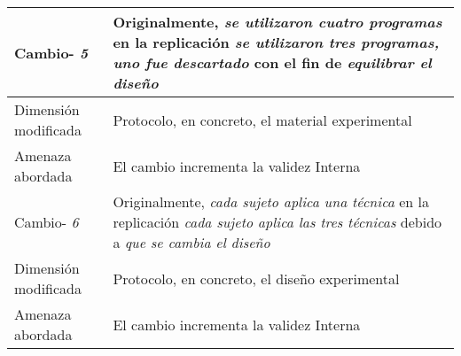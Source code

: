 

\begin{table}

\begin{tabular}{| p{3.3cm} | p{9cm} |}
 \hline
Cambio- \textit{5}   & \parbox[t]{9cm} {Originalmente,  \textit{se utilizaron cuatro programas} } \parbox[t]{9cm}{en la replicación \textit{se utilizaron tres programas, uno fue descartado } }  con el fin de  \textit{equilibrar el diseño} \\  \hline
Dimensión modificada & Protocolo, en concreto, el material experimental
 \\  \hline 
Amenaza abordada  & El cambio incrementa la validez Interna \\  \hline \hline

Cambio- \textit{6}   & \parbox[t]{9cm} {Originalmente,  \textit{cada sujeto aplica una técnica} } \parbox[t]{9cm}{en la replicación \textit{cada sujeto aplica las tres técnicas } }  debido a  \textit{ que se cambia el diseño} \\  \hline
Dimensión modificada &  Protocolo, en concreto,  el diseño experimental
 \\  \hline 
Amenaza abordada  & El cambio incrementa la validez Interna \\  \hline 




\end{tabular}
\label{tab:plantillaUPM2b}
\end{table}





